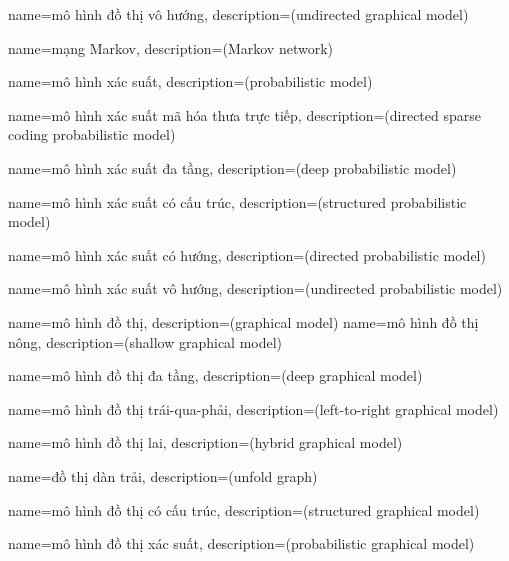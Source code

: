 {
    name={mô hình đồ thị vô hướng},
    description={(undirected graphical model)}
}

{
    name={mạng Markov},
    description={(Markov network)}
}

{
    name={mô hình xác suất},
    description={(probabilistic model)}
}

{
    name={mô hình xác suất mã hóa thưa trực tiếp},
    description={(directed sparse coding probabilistic model)}
}

{
    name={mô hình xác suất đa tầng},
    description={(deep probabilistic model)}
}

{
    name={mô hình xác suất có cấu trúc},
    description={(structured probabilistic model)}
}

{
    name={mô hình xác suất có hướng},
    description={(directed probabilistic model)}
}

{
    name={mô hình xác suất vô hướng},
    description={(undirected probabilistic model)}
}

{
    name={mô hình đồ thị},
    description={(graphical model)}
}
{
    name={mô hình đồ thị nông},
    description={(shallow graphical model)}
}

{
    name={mô hình đồ thị đa tầng},
    description={(deep graphical model)}
}

{
    name={mô hình đồ thị trái-qua-phải},
    description={(left-to-right graphical model)}
}

{
    name={mô hình đồ thị lai},
    description={(hybrid graphical model)}
}

{
    name={đồ thị dàn trải},
    description={(unfold graph)}
}

{
    name={mô hình đồ thị có cấu trúc},
    description={(structured graphical model)}
}

{
    name={mô hình đồ thị xác suất},
    description={(probabilistic graphical model)}
}

